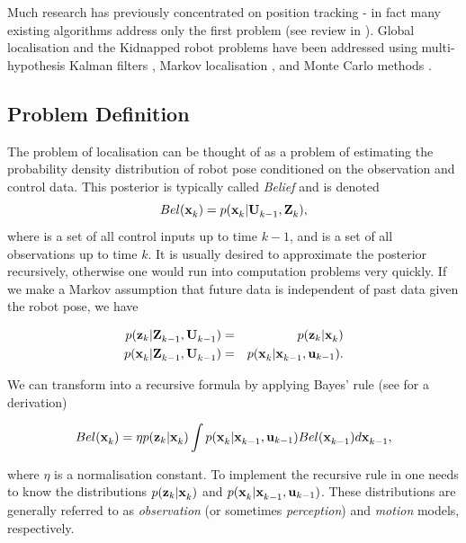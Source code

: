 Much research has previously concentrated on position tracking - in
fact many existing algorithms address only the first problem (see
review in \cite{Borenstein96}). Global localisation and the Kidnapped
robot problems have been addressed using multi-hypothesis Kalman
filters \cite{JensfeltKristensen01,Cox94}, Markov localisation
\cite{Fox99}, and Monte Carlo methods \cite{Thrun00j}.


\subsection{Problem Definition}

The problem of localisation can be thought of as a problem of
estimating the probability density distribution of robot pose
conditioned on the observation and control data.  This posterior is
typically called {\it Belief} and is denoted
\begin{equation}
  Bel(\x{k}{}{}) = p(\x{k}{}{} | \Uall{k-1}{}, \Zall{k}{}),
\label{eqn:localise_belief}
\end{equation}
where  is a set of all control inputs up to time $k-1$, and
 is a set of all observations up to time $k$. It is usually
desired to approximate the posterior recursively, otherwise one would
run into computation problems very quickly.  If we make a Markov
assumption that future data is independent of past data given the
robot pose, we have

\begin{eqnarray}
 p(\z{k} | \Zall{k-1}{}, \Uall{k-1}{})    &=& p(\z{k} | \x{k}{}{}) \\
 p(\x{k}{}{} | \Zall{k-1}{}, \Uall{k-1}{})&=& p(\x{k}{}{} | \x{k-1}{}{}, \U{k-1}{}).
\end{eqnarray}

We can transform  into a recursive
formula by applying Bayes' rule (see \cite{Thrun00j} for a derivation)

\begin{equation}
Bel(\x{k}{}{}) = \eta p(\z{k} | \x{k}{}{}) \int 
                     p(\x{k}{}{} | \x{k-1}{}{}, \U{k-1}{}) 
                     Bel(\x{k-1}{}{}) d \x{k-1}{}{},
\label{eqn:localise_recursion}
\end{equation}

where $\eta$ is a normalisation constant. To implement the recursive
rule in  one needs to know the
distributions $p(\z{k} | \x{k}{}{})$ and $p(\x{k}{}{} | \x{k-1}{}{},
\U{k-1}{})$. These distributions are generally referred to as {\it
observation} (or sometimes {\it perception}) and {\it motion} models,
respectively. 

